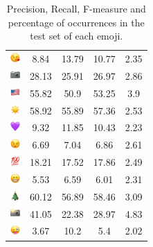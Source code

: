 \documentclass{article}
\begin{document}
\begin{table}
\begin{tabular}{|c|ccc|c|}
\includegraphics[height=0.37cm,width=0.37cm]{img/face_blowing_a_kiss.png} & 8.84 & 13.79 & 10.77 & 2.35\\ 
\includegraphics[height=0.37cm,width=0.37cm]{img/camera.png} & 28.13 & 25.91 & 26.97 & 2.86\\ 
\includegraphics[height=0.37cm,width=0.37cm]{img/United_States.png} & 55.82 & 50.9 & 53.25 & 3.9\\ 
\includegraphics[height=0.37cm,width=0.37cm]{img/sun.png} & 58.92 & 55.89 & 57.36 & 2.53\\ 
\includegraphics[height=0.37cm,width=0.37cm]{img/purple_heart.png} & 9.32 & 11.85 & 10.43 & 2.23\\ 
\includegraphics[height=0.37cm,width=0.37cm]{img/winking_face.png} & 6.69 & 7.04 & 6.86 & 2.61\\ 
\includegraphics[height=0.37cm,width=0.37cm]{img/hundred_points.png} & 18.21 & 17.52 & 17.86 & 2.49\\ 
\includegraphics[height=0.37cm,width=0.37cm]{img/beaming_face_with_smiling_eyes.png} & 5.53 & 6.59 & 6.01 & 2.31\\ 
\includegraphics[height=0.37cm,width=0.37cm]{img/Christmas_tree.png} & 60.12 & 56.89 & 58.46 & 3.09\\ 
\includegraphics[height=0.37cm,width=0.37cm]{img/camera_with_flash.png} & 41.05 & 22.38 & 28.97 & 4.83\\ 
\includegraphics[height=0.37cm,width=0.37cm]{img/winking_face_with_tongue.png} & 3.67 & 10.2 & 5.4 & 2.02\\ 

\hline
\end{tabular}
\caption{\label{table:emoji_detailed} Precision, Recall, F-measure and percentage of occurrences in the test set of each emoji.}
\end{table}
\end{document}
